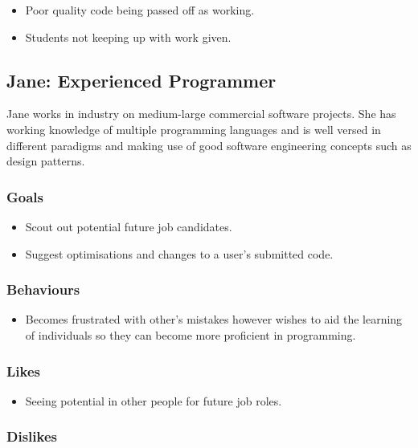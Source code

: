 \documentclass{sig-alt-release2}
\begin{document}
\begin{itemize}
\item Poor quality code being passed off as working.
\item Students not keeping up with work given.
\end{itemize}

\subsection{Jane: Experienced Programmer}

Jane works in industry on medium-large commercial software projects. She has 
working knowledge of multiple programming languages and is well versed in 
different paradigms and making use of good software engineering concepts such as 
design patterns.

\subsubsection{Goals}

\begin{itemize}
\item Scout out potential future job candidates.
\item Suggest optimisations and changes to a user's submitted code.
\end{itemize}

\subsubsection{Behaviours}

\begin{itemize}
\item Becomes frustrated with other's mistakes however wishes to aid the
learning of individuals so they can become more proficient in programming.
\end{itemize}

\subsubsection{Likes}

\begin{itemize}
\item Seeing potential in other people for future job roles.
\end{itemize}

\subsubsection{Dislikes}
\end{document}
